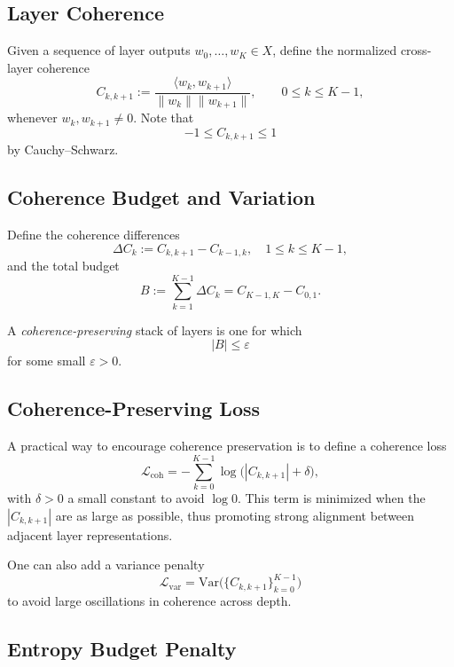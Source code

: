 \documentclass[11pt]{article}
\begin{document}
\subsection{Layer Coherence}

Given a sequence of layer outputs $w_0,\dots,w_K \in X$, define the normalized cross-layer coherence
\begin{equation}
  C_{k,k+1}
  := \frac{\langle w_k, w_{k+1}\rangle}{\|w_k\|\|w_{k+1}\|},
  \qquad 0\le k\le K-1,
  \label{eq:coherence}
\end{equation}
whenever $w_k,w_{k+1}\ne 0$. Note that
\[
  -1 \le C_{k,k+1} \le 1
\]
by Cauchy--Schwarz.

\subsection{Coherence Budget and Variation}

Define the coherence differences
\[
  \Delta C_k := C_{k,k+1} - C_{k-1,k}, \quad 1\le k\le K-1,
\]
and the total budget
\begin{equation}
  B := \sum_{k=1}^{K-1} \Delta C_k = C_{K-1,K} - C_{0,1}.
  \label{eq:budget}
\end{equation}

A \emph{coherence-preserving} stack of layers is one for which
\[
  |B| \le \varepsilon
\]
for some small $\varepsilon>0$.

\subsection{Coherence-Preserving Loss}

A practical way to encourage coherence preservation is to define a coherence loss
\begin{equation}
  \mathcal{L}_{\mathrm{coh}}
  = -\sum_{k=0}^{K-1} \log\bigl(|C_{k,k+1}| + \delta\bigr),
  \label{eq:cohLoss}
\end{equation}
with $\delta>0$ a small constant to avoid $\log 0$. This term is minimized when the $|C_{k,k+1}|$ are as large as possible, thus promoting strong alignment between adjacent layer representations.

One can also add a variance penalty
\begin{equation}
  \mathcal{L}_{\mathrm{var}} = \mathrm{Var}\bigl(\{C_{k,k+1}\}_{k=0}^{K-1}\bigr)
\end{equation}
to avoid large oscillations in coherence across depth.

\subsection{Entropy Budget Penalty}
\end{document}
